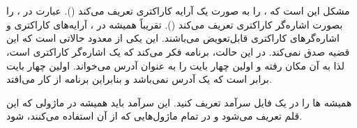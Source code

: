 \section{}
\paragraph{}\label{answer:7}
مشکل این است که ،  را به صورت یک آرایه کاراکتری تعریف می‌کند (). عبارت  در ،  را بصورت اشاره‌گر کاراکتری تعریف می‌کند (). تقریباً همیشه در ، آرایه‌های کاراکتری و اشاره‌گرهای کاراکتری قابل‌تعویض می‌باشند. این یکی از معدود حالاتی است که این قضیه صدق نمی‌کند. در این حالت، برنامه  فکر می‌کند که  یک اشاره‌گر کاراکتری است، لذا به آن مکان رفته و اولین چهار بایت را به عنوان آدرس می‌خواند. اولین چهار بایت برابر  است که یک آدرس نمی‌باشد و بنابراین برنامه از کار می‌افتد.

همیشه ها را در یک فایل سرآمد تعریف کنید. این سرآمد باید همیشه در ماژولی که این قلم تعریف می‌شود و در تمام ماژول‌هایی که از آن استفاده می‌کنند،  شود.